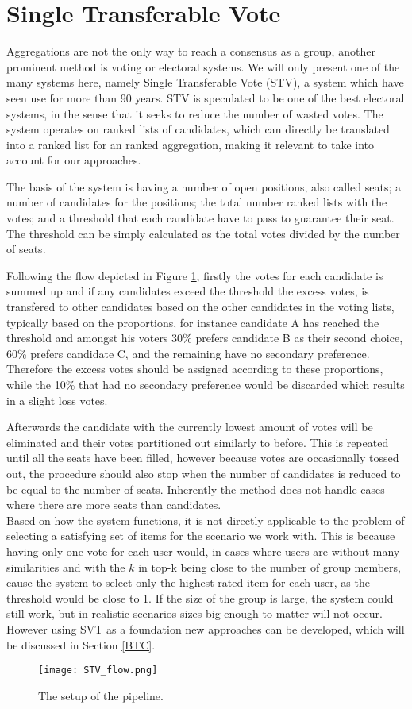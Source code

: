 \section{Single Transferable Vote} \label{sec:stv}
Aggregations are not the only way to reach a consensus as a group, another prominent method is voting or electoral systems. We will only present one of the many systems here, namely Single Transferable Vote (STV), a system which have seen use for more than 90 years. \cite{stvireland}
STV is speculated to be one of the best electoral systems, in the sense that it seeks to reduce the number of wasted votes. The system operates on ranked lists of candidates, which can directly be translated into a ranked list for an ranked aggregation, making it relevant to take into account for our approaches.

The basis of the system is having a number of open positions, also called seats; a number of candidates for the positions; the total number ranked lists with the votes; and a threshold that each candidate have to pass to guarantee their seat. The threshold can be simply calculated as the total votes divided by the number of seats. \cite{stv}

Following the flow depicted in Figure \ref{fig:stvflow}, firstly the votes for each candidate is summed up and if any candidates exceed the threshold the excess votes, is transfered to other candidates based on the other candidates in the voting lists, typically based on the proportions, for instance candidate A has reached the threshold and amongst his voters 30\% prefers candidate B as their second choice, 60\% prefers candidate C, and the remaining have no secondary preference. Therefore the excess votes should be assigned according to these proportions, while the 10\% that had no secondary preference would be discarded which results in a slight loss votes.

Afterwards the candidate with the currently lowest amount of votes will be eliminated and their votes partitioned out similarly to before. This is repeated until all the seats have been filled, however because votes are occasionally tossed out, the procedure should also stop when the number of candidates is reduced to be equal to the number of seats. Inherently the method does not handle cases where there are more seats than candidates.\\

Based on how the system functions, it is not directly applicable to the problem of selecting a satisfying set of items for the scenario we work with. This is because having only one vote for each user would, in cases where users are without many similarities and with the $k$ in top-k being close to the number of group members, cause the system to select only the highest rated item for each user, as the threshold would be close to 1. If the size of the group is large, the system could still work, but in realistic scenarios sizes big enough to matter will not occur. However using SVT as a foundation new approaches can be developed, which will be discussed in Section \ref{BTC}.

\begin{figure}
	\centering
	\texttt{[image: STV\_flow.png]}
	\caption{The setup of the pipeline.}
	\label{fig:stvflow}
\end{figure}
